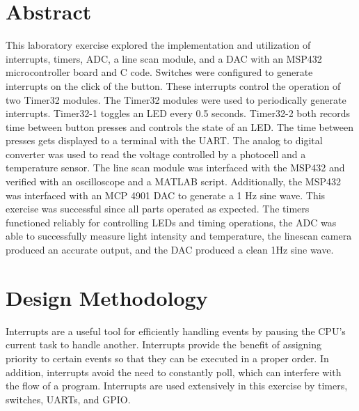 \documentclass[CMPE]{KGCOEReport}
\begin{document}
\maketitle

\section*{Abstract}

This laboratory exercise explored the implementation and utilization of interrupts, timers, ADC, a line scan module, and a DAC with an MSP432 microcontroller board and C code. Switches were configured to generate interrupts on the click of the button. These interrupts control the operation of two Timer32 modules. The Timer32 modules were used to periodically generate interrupts. Timer32-1 toggles an LED every 0.5 seconds. Timer32-2 both records time between button presses and controls the state of an LED. The time between presses gets displayed to a terminal with the UART. The analog to digital converter was used to read the voltage controlled by a photocell and a temperature sensor. The line scan module was interfaced with the MSP432 and verified with an oscilloscope and a MATLAB script. Additionally, the MSP432 was interfaced with an MCP 4901 DAC to generate a 1 Hz sine wave. This exercise was successful since all parts operated as expected. The timers functioned reliably for controlling LEDs and timing operations, the ADC was able to successfully measure light intensity and temperature, the linescan camera produced an accurate output, and the DAC produced a clean 1Hz sine wave.

\section*{Design Methodology}

Interrupts are a useful tool for efficiently handling events by pausing the CPU's current task to handle another. Interrupts provide the benefit of assigning priority to certain events so that they can be executed in a proper order. In addition, interrupts avoid the need to constantly poll, which can interfere with the flow of a program. Interrupts are used extensively in this exercise by timers, switches, UARTs, and GPIO.\\
\end{document}
